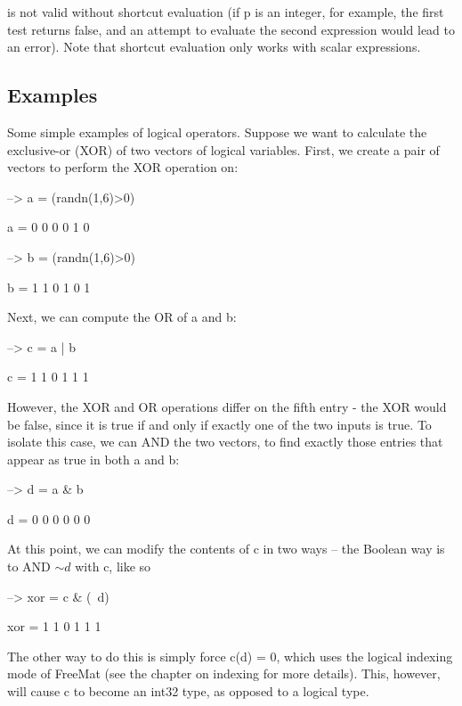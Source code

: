  is not valid without shortcut evaluation (if {\ttfamily p} is an integer, for example, the first test returns false, and an attempt to evaluate the second expression would lead to an error). Note that shortcut evaluation only works with scalar expressions. \hypertarget{variables_matrix_Examples}{}\subsection{Examples}\label{variables_matrix_Examples}
Some simple examples of logical operators. Suppose we want to calculate the exclusive-\/or (X\-O\-R) of two vectors of logical variables. First, we create a pair of vectors to perform the X\-O\-R operation on\-:


\begin{DoxyVerbInclude}
--> a = (randn(1,6)>0)

a = 
 0 0 0 0 1 0 

--> b = (randn(1,6)>0)

b = 
 1 1 0 1 0 1 
\end{DoxyVerbInclude}


Next, we can compute the O\-R of {\ttfamily a} and {\ttfamily b}\-:


\begin{DoxyVerbInclude}
--> c = a | b

c = 
 1 1 0 1 1 1 
\end{DoxyVerbInclude}


However, the X\-O\-R and O\-R operations differ on the fifth entry -\/ the X\-O\-R would be false, since it is true if and only if exactly one of the two inputs is true. To isolate this case, we can A\-N\-D the two vectors, to find exactly those entries that appear as true in both {\ttfamily a} and {\ttfamily b}\-:


\begin{DoxyVerbInclude}
--> d = a & b

d = 
 0 0 0 0 0 0 
\end{DoxyVerbInclude}


At this point, we can modify the contents of {\ttfamily c} in two ways -- the Boolean way is to A\-N\-D $\sim d$ with {\ttfamily c}, like so


\begin{DoxyVerbInclude}
--> xor = c & (~d)

xor = 
 1 1 0 1 1 1 
\end{DoxyVerbInclude}


The other way to do this is simply force {\ttfamily c(d) = 0}, which uses the logical indexing mode of Free\-Mat (see the chapter on indexing for more details). This, however, will cause {\ttfamily c} to become an {\ttfamily int32} type, as opposed to a logical type.


